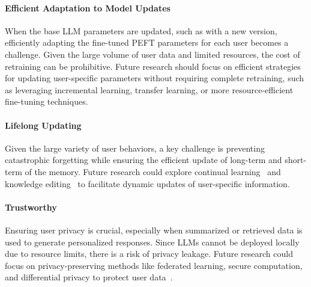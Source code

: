\paragraph{Efficient Adaptation to Model Updates}
When the base LLM parameters are updated, such as with a new version, efficiently adapting the fine-tuned PEFT parameters for each user becomes a challenge. Given the large volume of user data and limited resources, the cost of retraining can be prohibitive. Future research should focus on efficient strategies for updating user-specific parameters without requiring complete retraining, such as leveraging incremental learning, transfer learning, or more resource-efficient fine-tuning techniques.

\paragraph{Lifelong Updating}
Given the large variety of user behaviors, a key challenge is preventing catastrophic forgetting while ensuring the efficient update of long-term and short-term of the memory. Future research could explore continual learning~\citep{wu2024continual} and knowledge editing~\citep{wang2024knowledge} to facilitate dynamic updates of user-specific information.


\paragraph{Trustworthy} 
Ensuring user privacy is crucial, especially when summarized or retrieved data is used to generate personalized responses. Since LLMs cannot be deployed locally due to resource limits, there is a risk of privacy leakage. Future research could focus on privacy-preserving methods like federated learning, secure computation, and differential privacy to protect user data~\citep{yao2024federated, liu2024client}.







